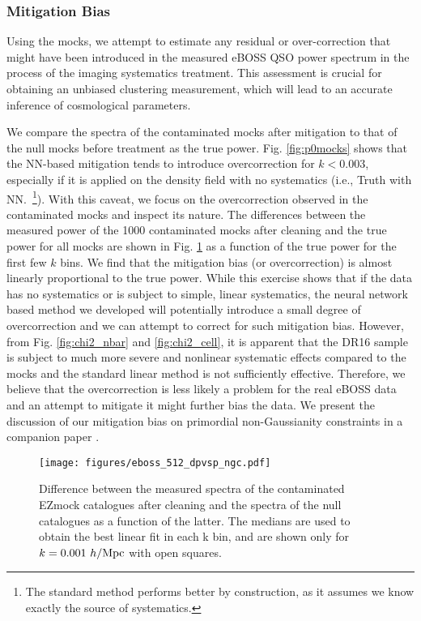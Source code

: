 \subsubsection{Mitigation Bias}
Using the mocks, we attempt to estimate any residual or over-correction that might have been introduced in the measured eBOSS QSO power spectrum in the process of the imaging systematics treatment. This assessment is crucial for obtaining an unbiased clustering measurement, which will lead to an accurate inference of cosmological parameters.

We compare the spectra of the contaminated mocks after mitigation to that of the null mocks before treatment as the true power. Fig. \ref{fig:p0mocks} shows that the NN-based mitigation tends to introduce overcorrection for $k< 0.003$, especially if it is applied on the density field with no systematics (i.e., Truth with NN.~\footnote{The standard method performs better by construction, as it assumes we know exactly the source of systematics.}). With this caveat, we focus on the overcorrection observed in the contaminated mocks and inspect its nature. The differences between the measured power of the 1000 contaminated mocks after cleaning and the true power for all mocks are shown in Fig. \ref{fig:dpvsp} as a function of the true power for the first few $k$ bins. We find that the mitigation bias (or overcorrection) is almost linearly proportional to the true power. While this exercise shows that if the data has no systematics or is subject to simple, linear systematics, the neural network based method we developed will potentially introduce a small degree of overcorrection and we can attempt to correct for such mitigation bias. However, from Fig. \ref{fig:chi2_nbar} and \ref{fig:chi2_cell}, it is apparent that the DR16 sample is subject to much more severe and nonlinear systematic effects compared to the mocks and the standard linear method is not sufficiently effective. Therefore, we believe that the overcorrection is less likely a problem for the real eBOSS data and an attempt to mitigate it might further bias the data. We present the discussion of our mitigation bias on primordial non-Gaussianity constraints in a companion paper \citep{mueller2020fnl}.

\begin{figure}
    \centering
    \texttt{[image: figures/eboss\_512\_dpvsp\_ngc.pdf]}
    \caption[Residual bias between mock power spectra after mitigation.]{Difference between the measured spectra of the contaminated EZmock catalogues after cleaning and the spectra of the null catalogues as a function of the latter. The medians are used to obtain the best linear fit in each k bin, and are shown only for $k=0.001~h/{\rm Mpc}$ with open squares.}
    \label{fig:dpvsp}
\end{figure}